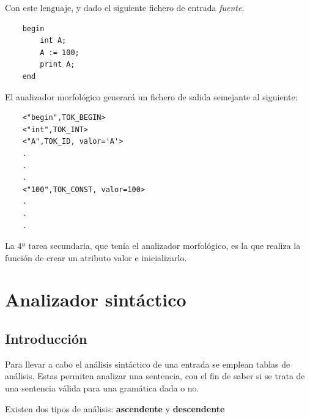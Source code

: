 \documentclass{apuntes}
\begin{document}
Con este lenguaje, y dado el siguiente fichero de entrada  \textit{fuente}.

\begin{verbatim}
    begin
        int A;
        A := 100;
        print A;
    end
\end{verbatim}

El analizador morfológico generará un fichero de salida semejante al siguiente:

\begin{verbatim}
    <"begin",TOK_BEGIN>
    <"int",TOK_INT>
    <"A",TOK_ID, valor='A'>
    .
    .
    .
    <"100",TOK_CONST, valor=100>
    .
    .
    .
\end{verbatim}

La 4ª tarea secundaria, que tenía el analizador morfológico, es la que realiza la función de crear un atributo valor e inicializarlo.

\chapter{Analizador sintáctico}

\section{Introducción}

Para llevar a cabo el análisis sintáctico de una entrada se emplean tablas de análisis. Estas permiten analizar una sentencia, con el fin de saber si se trata de una sentencia válida para una gramática dada o no.

Existen dos tipos de análisis: \textbf{ascendente} y \textbf{descendente}
\end{document}
